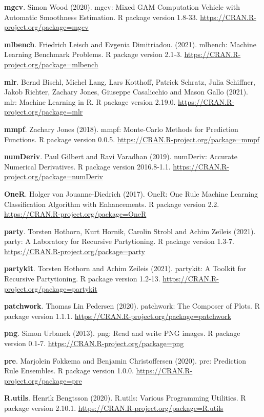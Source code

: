 \documentclass[12pt,]{krantz}
\begin{document}
\textbf{mgcv}. Simon Wood (2020). mgcv: Mixed GAM Computation Vehicle
with Automatic Smoothness Estimation. R package version 1.8-33.
\url{https://CRAN.R-project.org/package=mgcv}

\textbf{mlbench}. Friedrich Leisch and Evgenia Dimitriadou. (2021).
mlbench: Machine Learning Benchmark Problems. R package version 2.1-3.
\url{https://CRAN.R-project.org/package=mlbench}

\textbf{mlr}. Bernd Bischl, Michel Lang, Lars Kotthoff, Patrick Schratz,
Julia Schiffner, Jakob Richter, Zachary Jones, Giuseppe Casalicchio and
Mason Gallo (2021). mlr: Machine Learning in R. R package version
2.19.0. \url{https://CRAN.R-project.org/package=mlr}

\textbf{mmpf}. Zachary Jones (2018). mmpf: Monte-Carlo Methods for
Prediction Functions. R package version 0.0.5.
\url{https://CRAN.R-project.org/package=mmpf}

\textbf{numDeriv}. Paul Gilbert and Ravi Varadhan (2019). numDeriv:
Accurate Numerical Derivatives. R package version 2016.8-1.1.
\url{https://CRAN.R-project.org/package=numDeriv}

\textbf{OneR}. Holger von Jouanne-Diedrich (2017). OneR: One Rule
Machine Learning Classification Algorithm with Enhancements. R package
version 2.2. \url{https://CRAN.R-project.org/package=OneR}

\textbf{party}. Torsten Hothorn, Kurt Hornik, Carolin Strobl and Achim
Zeileis (2021). party: A Laboratory for Recursive Partytioning. R
package version 1.3-7. \url{https://CRAN.R-project.org/package=party}

\textbf{partykit}. Torsten Hothorn and Achim Zeileis (2021). partykit: A
Toolkit for Recursive Partytioning. R package version 1.2-13.
\url{https://CRAN.R-project.org/package=partykit}

\textbf{patchwork}. Thomas Lin Pedersen (2020). patchwork: The Composer
of Plots. R package version 1.1.1.
\url{https://CRAN.R-project.org/package=patchwork}

\textbf{png}. Simon Urbanek (2013). png: Read and write PNG images. R
package version 0.1-7. \url{https://CRAN.R-project.org/package=png}

\textbf{pre}. Marjolein Fokkema and Benjamin Christoffersen (2020). pre:
Prediction Rule Ensembles. R package version 1.0.0.
\url{https://CRAN.R-project.org/package=pre}

\textbf{R.utils}. Henrik Bengtsson (2020). R.utils: Various Programming
Utilities. R package version 2.10.1.
\url{https://CRAN.R-project.org/package=R.utils}
\end{document}
